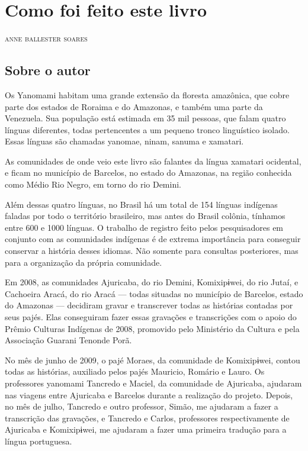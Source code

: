 \chapter{Como foi feito este livro}

\begin{flushright}
\textsc{anne ballester soares}
\end{flushright}
\bigskip

\section{Sobre o autor}

\noindent{}Os Yanomami habitam uma grande extensão da floresta amazônica, que cobre
parte dos estados de Roraima e do Amazonas, e também uma parte da
Venezuela. Sua população está estimada em 35 mil pessoas, que falam
quatro línguas diferentes, todas pertencentes a um pequeno tronco
linguístico isolado. Essas línguas são chamadas yanomae, ninam, sanuma e
xamatari.

As comunidades de onde veio este livro são falantes da língua xamatari
ocidental, e ficam no município de Barcelos, no estado do Amazonas, na
região conhecida como Médio Rio Negro, em torno do rio Demini. 
 
Além dessas quatro línguas, no Brasil há um
total de 154 línguas indígenas faladas por todo o território brasileiro,
mas antes do Brasil colônia, tínhamos entre 600 e 1000 línguas. O
trabalho de registro feito pelos pesquisadores em conjunto com as
comunidades indígenas é de extrema importância para conseguir conservar
a história desses idiomas. Não somente para consultas posteriores, mas
para a organização da própria comunidade.

Em 2008, as comunidades Ajuricaba, do rio Demini, Komixipɨwei, do rio
Jutaí, e Cachoeira Aracá, do rio Aracá --- todas situadas no município
de Barcelos, estado do Amazonas --- decidiram gravar e transcrever todas
as histórias contadas por seus pajés. Elas conseguiram fazer essas
gravações e transcrições com o apoio do Prêmio Culturas Indígenas de
2008, promovido pelo Ministério da Cultura e pela Associação Guarani
Tenonde Porã.

No mês de junho de 2009, o pajé Moraes, da comunidade de Komixipɨwei,
contou todas as histórias, auxiliado pelos pajés Mauricio, Romário e
Lauro. Os professores yanomami Tancredo e Maciel, da comunidade de
Ajuricaba, ajudaram nas viagens entre Ajuricaba e Barcelos durante a
realização do projeto. Depois, no mês de julho, Tancredo e outro
professor, Simão, me ajudaram a fazer a transcrição das gravações, e
Tancredo e Carlos, professores respectivamente de Ajuricaba e
Komixipɨwei, me ajudaram a fazer uma primeira tradução para a língua
portuguesa.  

